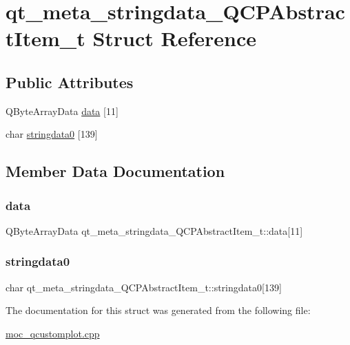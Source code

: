\hypertarget{structqt__meta__stringdata__QCPAbstractItem__t}{}\section{qt\+\_\+meta\+\_\+stringdata\+\_\+\+Q\+C\+P\+Abstract\+Item\+\_\+t Struct Reference}
\label{structqt__meta__stringdata__QCPAbstractItem__t}
\subsection*{Public Attributes}
\begin{DoxyCompactItemize}
\item 
Q\+Byte\+Array\+Data \mbox{\hyperlink{structqt__meta__stringdata__QCPAbstractItem__t_a9e33f2a80b5df62d63aafd9326b07a92}{data}} \mbox{[}11\mbox{]}
\item 
char \mbox{\hyperlink{structqt__meta__stringdata__QCPAbstractItem__t_a4a1f8f9acd2583f039a05de696c20ba6}{stringdata0}} \mbox{[}139\mbox{]}
\end{DoxyCompactItemize}


\subsection{Member Data Documentation}
\mbox{\label{structqt__meta__stringdata__QCPAbstractItem__t_a9e33f2a80b5df62d63aafd9326b07a92}} 
\subsubsection{\texorpdfstring{data}{data}}
{\footnotesize\ttfamily Q\+Byte\+Array\+Data qt\+\_\+meta\+\_\+stringdata\+\_\+\+Q\+C\+P\+Abstract\+Item\+\_\+t\+::data\mbox{[}11\mbox{]}}

\mbox{\label{structqt__meta__stringdata__QCPAbstractItem__t_a4a1f8f9acd2583f039a05de696c20ba6}} 
\subsubsection{\texorpdfstring{stringdata0}{stringdata0}}
{\footnotesize\ttfamily char qt\+\_\+meta\+\_\+stringdata\+\_\+\+Q\+C\+P\+Abstract\+Item\+\_\+t\+::stringdata0\mbox{[}139\mbox{]}}



The documentation for this struct was generated from the following file\+:\begin{DoxyCompactItemize}
\item 
\mbox{\hyperlink{moc__qcustomplot_8cpp}{moc\+\_\+qcustomplot.\+cpp}}\end{DoxyCompactItemize}
